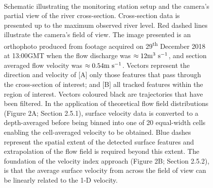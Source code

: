 \documentclass[hess, manuscript]{copernicus} %
\begin{document}
\begin{figure}[]
\centering\Large
{} \\
\caption{Schematic illustrating the monitoring station setup and the camera's partial view of the river cross-section. Cross-section data is presented up to the maximum observed river level. Red dashed lines illustrate the camera's field of view. The image presented is an orthophoto produced from footage acquired on 29\textsuperscript{th} December 2018 at 13:00GMT when the flow discharge was $\approx12\textnormal{m\textsuperscript{3} s\textsuperscript{-1}}$, and section averaged flow velocity was $\approx0.54\textnormal{m s\textsuperscript{-1}}$. Vectors represent the direction and velocity of [A] only those features that pass through the cross-section of interest; and [B] all tracked features within the region of interest. Vectors coloured black are trajectories that have been filtered. In the application of theoretical flow field distributions (Figure 2A; Section 2.5.1), surface velocity data is converted to a depth-averaged before being binned into one of 20 equal-width cells enabling the cell-averaged velocity to be obtained. Blue dashes represent the spatial extent of the detected surface features and extrapolation of the flow field is required beyond this extent. The foundation of the velocity index approach (Figure 2B; Section 2.5.2), is that the average surface velocity from across the field of view can be linearly related to the 1-D velocity. }
\label{Figure2} 
\end{figure}
\end{document}
